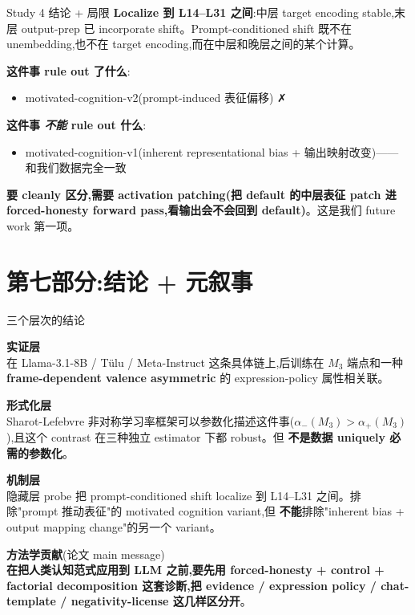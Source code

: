\documentclass[aspectratio=169,11pt]{ctexbeamer}
\newcommand{\hi}[1]{\textcolor{ow-red}{\textbf{#1}}}
\newcommand{\hib}[1]{\textcolor{ow-blue}{\textbf{#1}}}
\begin{document}
\begin{frame}{Study 4 结论 + 局限}
\textbf{Localize 到 \hi{L14--L31 之间}}:中层 target encoding stable,末层 output-prep 已 incorporate shift。Prompt-conditioned shift 既不在 unembedding,也不在 target encoding,而在中层和晚层之间的某个计算。

\bigskip
\textbf{这件事 rule out 了什么}:
\begin{itemize}\setlength{\itemsep}{0pt}
\item motivated-cognition-v2(prompt-induced 表征偏移) ✗
\end{itemize}

\bigskip
\textbf{这件事 \emph{不能} rule out 什么}:
\begin{itemize}\setlength{\itemsep}{0pt}
\item motivated-cognition-v1(inherent representational bias + 输出映射改变)—— 和我们数据完全一致
\end{itemize}

\bigskip
\hi{要 cleanly 区分,需要 activation patching(把 default 的中层表征 patch 进 forced-honesty forward pass,看输出会不会回到 default)}。这是我们 future work 第一项。
\end{frame}

\section{第七部分:结论 + 元叙事}

\begin{frame}{三个层次的结论}

\textbf{实证层}\\
在 Llama-3.1-8B / Tülu / Meta-Instruct 这条具体链上,后训练在 $M_3$ 端点和一种 \hi{frame-dependent valence asymmetric} 的 expression-policy 属性相关联。

\bigskip
\textbf{形式化层}\\
Sharot-Lefebvre 非对称学习率框架可以参数化描述这件事($\alpha_-(M_3) > \alpha_+(M_3)$),且这个 contrast 在三种独立 estimator 下都 robust。但 \hib{不是数据 uniquely 必需的参数化}。

\bigskip
\textbf{机制层}\\
隐藏层 probe 把 prompt-conditioned shift localize 到 L14--L31 之间。排除"prompt 推动表征"的 motivated cognition variant,但 \hib{不能}排除"inherent bias + output mapping change"的另一个 variant。

\bigskip
\textbf{方法学贡献}(论文 main message)\\
\hi{在把人类认知范式应用到 LLM 之前,要先用 forced-honesty + control + factorial decomposition 这套诊断,把 evidence / expression policy / chat-template / negativity-license 这几样区分开}。
\end{frame}
\end{document}
